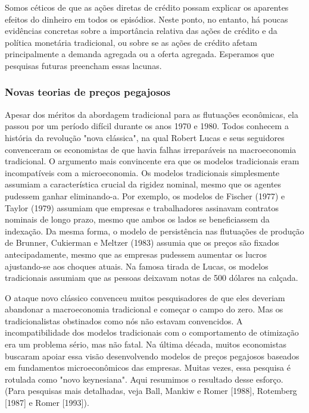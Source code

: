 \documentclass[a4paper,12pt]{article}[abntex2]
\begin{document}
Somos céticos de que as ações diretas de crédito possam explicar os aparentes efeitos do dinheiro em todos os episódios. Neste ponto, no entanto, há poucas evidências concretas sobre a importância relativa das ações de crédito e da política monetária tradicional, ou sobre se as ações de crédito afetam principalmente a demanda agregada ou a oferta agregada. Esperamos que pesquisas futuras preencham essas lacunas.

\subsubsection{\textbf{Novas teorias de preços pegajosos}}

Apesar dos méritos da abordagem tradicional para as flutuações econômicas, ela passou por um período difícil durante os anos 1970 e 1980. Todos conhecem a história da revolução "nova clássica", na qual Robert Lucas e seus seguidores convenceram os economistas de que havia falhas irreparáveis na macroeconomia tradicional. O argumento mais convincente era que os modelos tradicionais eram incompatíveis com a microeconomia. Os modelos tradicionais simplesmente assumiam a característica crucial da rigidez nominal, mesmo que os agentes pudessem ganhar eliminando-a. Por exemplo, os modelos de Fischer (1977) e Taylor (1979) assumiam que empresas e trabalhadores assinavam contratos nominais de longo prazo, mesmo que ambos os lados se beneficiassem da indexação. Da mesma forma, o modelo de persistência nas flutuações de produção de Brunner, Cukierman e Meltzer (1983) assumia que os preços são fixados antecipadamente, mesmo que as empresas pudessem aumentar os lucros ajustando-se aos choques atuais. Na famosa tirada de Lucas, os modelos tradicionais assumiam que as pessoas deixavam notas de 500 dólares na calçada.

O ataque novo clássico convenceu muitos pesquisadores de que eles deveriam abandonar a macroeconomia tradicional e começar o campo do zero. Mas os tradicionalistas obstinados como nós não estavam convencidos. A incompatibilidade dos modelos tradicionais com o comportamento de otimização era um problema sério, mas não fatal. Na última década, muitos economistas buscaram apoiar essa visão desenvolvendo modelos de preços pegajosos baseados em fundamentos microeconômicos das empresas. Muitas vezes, essa pesquisa é rotulada como "novo keynesiana". Aqui resumimos o resultado desse esforço. (Para pesquisas mais detalhadas, veja Ball, Mankiw e Romer [1988], Rotemberg [1987] e Romer [1993]).
\end{document}
